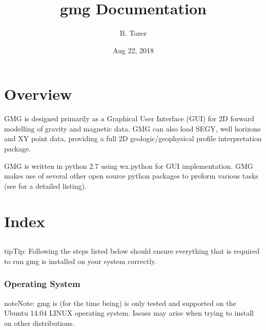 \documentclass[a4paper,10pt,english]{sphinxmanual}
\title{gmg Documentation}
\date{Aug 22, 2018}
\author{B. Tozer}
\begin{document}
\maketitle
\sphinxtableofcontents
{}\label{\detokenize{gmg_documentation::doc}}



\chapter{Overview}
\label{\detokenize{gmg_documentation:gmg-an-open-source-geophysical-modelling-gui}}\label{\detokenize{gmg_documentation:overview}}
GMG is designed primarily as a Graphical User Interface (GUI) for 2D forward
modelling of gravity and magnetic data. GMG can also load SEGY, well horizons
and XY point data, providing a full 2D geologic/geophysical profile
interpretation package.

GMG is written in python 2.7 using wx.python for GUI implementation. GMG makes
use of several other open source python packages to preform various tasks
(see  for a detailed listing).


\chapter{Index}
\label{\detokenize{gmg_documentation:index}}

\section{}
\label{\detokenize{installation:id1}}\label{\detokenize{installation::doc}}\label{\detokenize{installation:installation}}
\begin{sphinxadmonition}{tip}{Tip:}
Following the steps listed below should ensure everything that is required to run gmg is installed on your system correctly.
\end{sphinxadmonition}


\subsection{Operating System}
\label{\detokenize{installation:operating-system}}
\begin{sphinxadmonition}{note}{Note:}
gmg is (for the time being) is only tested and supported on the Ubuntu 14.04 LINUX operating system.
Issues may arise when trying to install on other distributions.
\end{sphinxadmonition}
\end{document}

